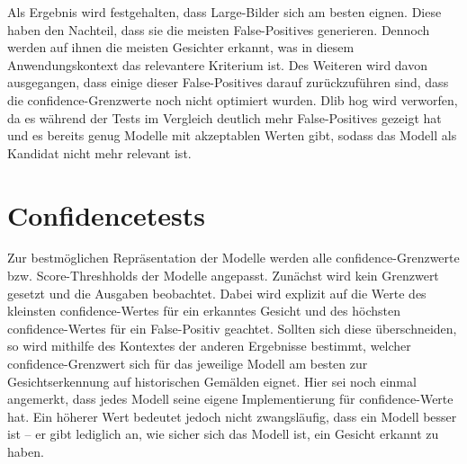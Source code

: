 Als Ergebnis wird festgehalten, dass Large-Bilder sich am besten eignen. Diese haben den Nachteil, dass sie die meisten False-Positives generieren. Dennoch werden auf ihnen die meisten Gesichter erkannt, was in diesem Anwendungskontext das relevantere Kriterium ist. Des Weiteren wird davon ausgegangen, dass einige dieser False-Positives darauf zurückzuführen sind, dass die \gls{confidence}-Grenzwerte noch nicht optimiert wurden. Dlib \gls{hog} wird verworfen, da es während der Tests im Vergleich deutlich mehr False-Positives gezeigt hat und es bereits genug Modelle mit akzeptablen Werten gibt, sodass das Modell als Kandidat nicht mehr relevant ist.

\section{Confidencetests}
Zur bestmöglichen Repräsentation der Modelle werden alle \gls{confidence}-Grenzwerte bzw. Score-Threshholds der Modelle angepasst. Zunächst wird kein Grenzwert gesetzt und die Ausgaben beobachtet. Dabei wird explizit auf die Werte des kleinsten \gls{confidence}-Wertes für ein erkanntes Gesicht und des höchsten \gls{confidence}-Wertes für ein False-Positiv geachtet. Sollten sich diese überschneiden, so wird mithilfe des Kontextes der anderen Ergebnisse bestimmt, welcher \gls{confidence}-Grenzwert sich für das jeweilige Modell am besten zur Gesichtserkennung auf historischen Gemälden eignet. Hier sei noch einmal angemerkt, dass jedes Modell seine eigene Implementierung für \gls{confidence}-Werte hat. Ein höherer Wert bedeutet jedoch nicht zwangsläufig, dass ein Modell besser ist – er gibt lediglich an, wie sicher sich das Modell ist, ein Gesicht erkannt zu haben.

